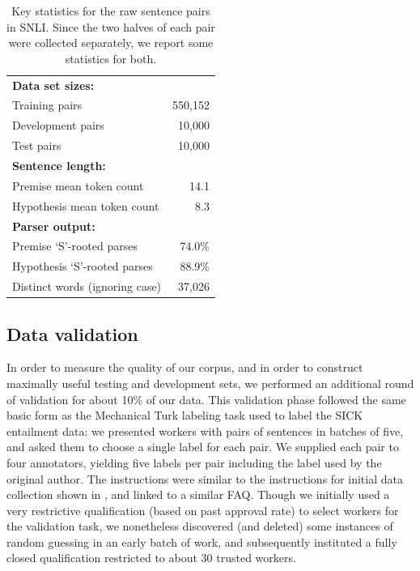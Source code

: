 \begin{table}
\center
  \begin{tabular}{l r} 
    \toprule
\multicolumn{2}{l}{\textbf{Data set sizes:}}\\
Training pairs &  550,152\\
Development pairs &  10,000\\
Test pairs & 10,000\\
\midrule
\multicolumn{2}{l}{\textbf{Sentence length:}}\\
Premise mean token count & 14.1\\
Hypothesis mean token count & 8.3 \\
\midrule
\multicolumn{2}{l}{\textbf{Parser output:}}\\
Premise `S'-rooted parses & 74.0\%\\
Hypothesis `S'-rooted parses & 88.9\%\\
Distinct words (ignoring case) & 37,026\\
    \bottomrule
  \end{tabular}
\caption{\label{collection-stats}Key statistics for the raw sentence pairs in SNLI. Since the two halves of each pair were collected separately, we report some statistics for both.} 
\end{table}


\subsection{Data validation}

In order to measure the quality of our corpus, and in order to construct maximally useful testing and development sets, we performed an additional round of validation for about 10\% of our data.
This validation phase followed the same basic form as the Mechanical Turk labeling task used to label the SICK entailment data: we presented workers with pairs of sentences in batches of five, and asked them to choose a single label for each pair. We supplied each pair to four annotators, yielding five labels per pair including the label used by the original author. The instructions were similar to the instructions for initial data collection shown in , and linked to a similar FAQ. Though we initially used a very restrictive qualification (based on past approval rate) to select workers for the validation task, we nonetheless discovered (and deleted) some instances of random guessing in an early batch of work, and subsequently instituted a fully closed qualification restricted to about 30 trusted workers.

